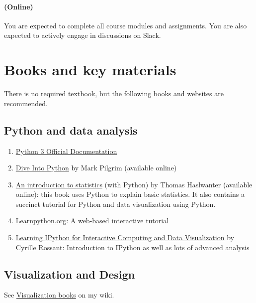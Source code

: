 \documentclass[11pt,article,oneside]{memoir} %
\begin{document}
\paragraph{(Online)} You are expected to complete all course modules and assignments. You are also expected to 
actively engage in discussions on Slack. 

\section{Books and key materials}%

There is no required textbook, but the following books and websites are
recommended.

\subsection{Python and data analysis}%

\begin{enumerate}%

\item \href{https://docs.python.org/3/}{Python 3 Official Documentation}

\item \href{http://www.diveintopython3.net/index.html}{Dive Into Python} by Mark Pilgrim (available online) 

\item \href{http://work.thaslwanter.at/Stats/html/}{An introduction to statistics} (with Python) by Thomas Haslwanter (available online): this book uses Python to explain basic statistics. It also contains a succinct tutorial for Python and data visualization using Python. 

\item \href{http://www.learnpython.org}{Learnpython.org}: A web-based interactive tutorial 

\item \href{http://ipython.rossant.net}{Learning IPython for Interactive Computing and Data Visualization} by  Cyrille Rossant: Introduction to IPython as well as lots of advanced analysis 


\end{enumerate}%
\subsection{Visualization and Design}%

See \href{http://yyahnwiki.appspot.com/Information_visualization#h_6225eb5bf8a031f750a1b03f810ccc6a}{Visualization books} on my wiki. 
\end{document}

